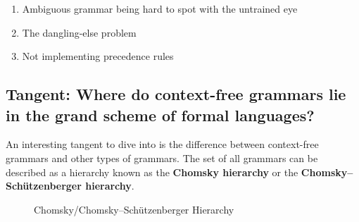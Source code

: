 \documentclass[12pt, letterpaper]{article}
\theoremstyle{definition}
\begin{document}
\begin{enumerate}
    \item Ambiguous grammar being hard to spot with the untrained eye
    \item The dangling-else problem
    \item Not implementing precedence rules
\end{enumerate}

\subsection{Tangent: Where do context-free grammars lie in the grand scheme of formal languages?}

An interesting tangent to dive into is the difference between context-free grammars and other types of grammars. The set of all grammars can be described as a hierarchy known as the \textbf{Chomsky hierarchy} or the \textbf{Chomsky–Schützenberger hierarchy}.

\begin{figure}[h]
    \begin{center}
        \caption{Chomsky/Chomsky–Schützenberger Hierarchy}
    \end{center}
\end{figure}
\end{document}
